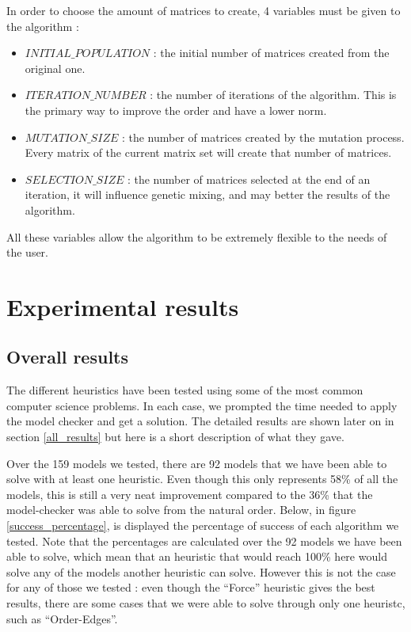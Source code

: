 \documentclass[12pt]{report}
\begin{document}
In order to choose the amount of matrices to create, 4 variables must be given to the algorithm :

\begin{itemize}
  \item $INITIAL\_POPULATION$ : the initial number of matrices created from the original one.
  \item $ITERATION\_NUMBER$ : the number of iterations of the algorithm. This is the primary way to improve the order and have a lower norm.
  \item $MUTATION\_SIZE$ : the number of matrices created by the mutation process. Every matrix of the current matrix set will create that number of matrices.
  \item $SELECTION\_SIZE$ : the number of matrices selected at the end of an iteration, it will influence genetic mixing, and may better the results of the algorithm.
\end{itemize}

All these variables allow the algorithm to be extremely flexible to the needs of the user. 

\chapter{Experimental results}

\section{Overall results}

The different heuristics have been tested using some of the most common computer science problems. In each case, we prompted the time needed to apply the model checker and get a solution. The detailed results are shown later on in section \ref{all_results} but here is a short description of what they gave.

Over the 159 models we tested, there are 92 models that we have been able to solve with at least one heuristic. Even though this only represents 58\% of all the models, this is still a very neat improvement compared to the 36\% that the model-checker was able to solve from the natural order.
Below, in figure \ref{success_percentage}, is displayed the percentage of success of each algorithm we tested. Note that the percentages are calculated over the 92 models we have been able to solve, which mean that an heuristic that would reach 100\% here would solve any of the models another heuristic can solve. However this is not the case for any of those we tested : even though the \enquote{Force} heuristic gives the best results, there are some cases that we were able to solve through only one heuristc, such as \enquote{Order-Edges}.
\end{document}
